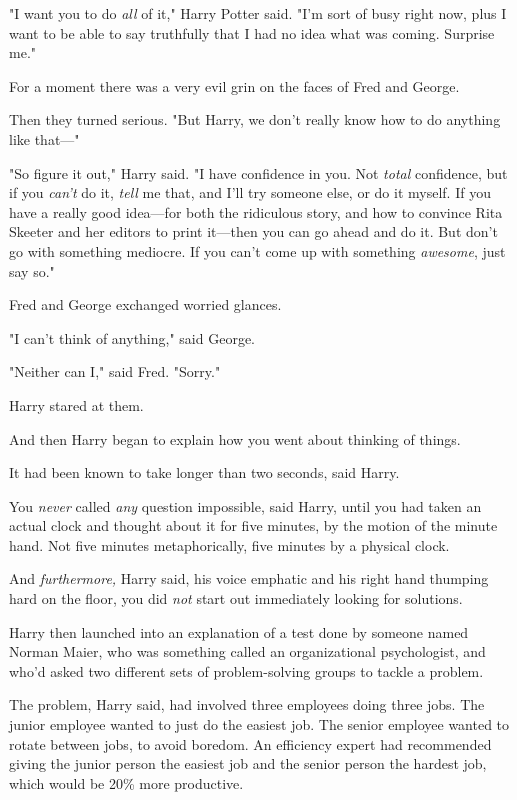 "I want you to do \emph{all} of it," Harry Potter said. "I'm sort of busy right
now, plus I want to be able to say truthfully that I had no idea what was
coming. Surprise me."

For a moment there was a very evil grin on the faces of Fred and George.

Then they turned serious. "But Harry, we don't really know how to do anything
like that---"

"So figure it out," Harry said. "I have confidence in you. Not \emph{total}
confidence, but if you \emph{can't} do it, \emph{tell} me that, and I'll try
someone else, or do it myself. If you have a really good idea---for both the
ridiculous story, and how to convince Rita Skeeter and her editors to print
it---then you can go ahead and do it. But don't go with something mediocre. If
you can't come up with something \emph{awesome}, just say so."

Fred and George exchanged worried glances.

"I can't think of anything," said George.

"Neither can I," said Fred. "Sorry."

Harry stared at them.

And then Harry began to explain how you went about thinking of things.

It had been known to take longer than two seconds, said Harry.

You \emph{never} called \emph{any} question impossible, said Harry, until you
had taken an actual clock and thought about it for five minutes, by the motion
of the minute hand. Not five minutes metaphorically, five minutes by a physical
clock.

And \emph{furthermore,} Harry said, his voice emphatic and his right hand
thumping hard on the floor, you did \emph{not} start out immediately looking
for solutions.

Harry then launched into an explanation of a test done by someone named Norman
Maier, who was something called an organizational psychologist, and who'd asked
two different sets of problem-solving groups to tackle a problem.

The problem, Harry said, had involved three employees doing three jobs. The
junior employee wanted to just do the easiest job. The senior employee wanted
to rotate between jobs, to avoid boredom. An efficiency expert had recommended
giving the junior person the easiest job and the senior person the hardest job,
which would be 20\% more productive.

